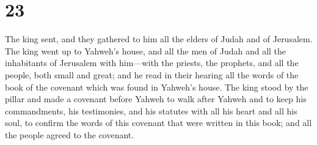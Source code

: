 \hypertarget{section-22}{%
\section{23}\label{section-22}}

 The king sent, and they gathered to him all the elders of
Judah and of Jerusalem.  The king went up to Yahweh's
house, and all the men of Judah and all the inhabitants of Jerusalem
with him---with the priests, the prophets, and all the people, both
small and great; and he read in their hearing all the words of the book
of the covenant which was found in Yahweh's house.  The
king stood by the pillar and made a covenant before Yahweh to walk after
Yahweh and to keep his commandments, his testimonies, and his statutes
with all his heart and all his soul, to confirm the words of this
covenant that were written in this book; and all the people agreed to
the covenant.

